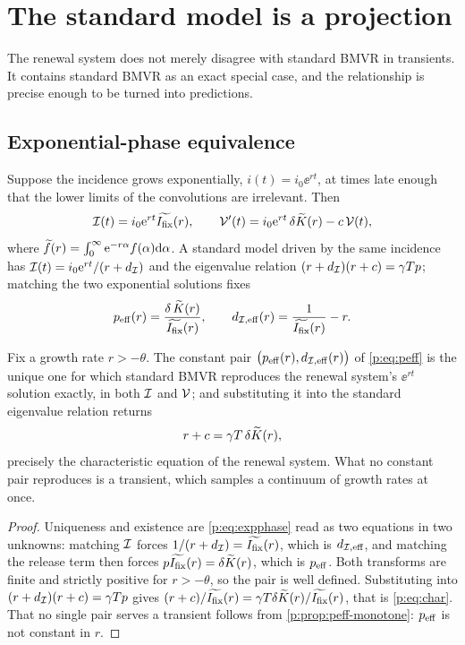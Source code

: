 \FloatBarrier

\section{The standard model is a projection}
\label{p:sec:projection}

The renewal system does not merely disagree with standard BMVR in
transients. It contains standard BMVR as an exact special case, and the
relationship is precise enough to be turned into predictions.

\subsection{Exponential-phase equivalence}

Suppose the incidence grows exponentially, $i(t)=i_0\ee^{rt}$, at times late
enough that the lower limits of the convolutions are irrelevant. Then
\begin{equation}
\mathcal{I}(t)=i_0\mathrm{e}^{rt}\widetilde{I_{\mathrm{fix}}}(r),
\qquad
\mathcal{V}'(t)=i_0\mathrm{e}^{rt}\,\delta\widetilde{K}(r)-c\,\mathcal{V}(t),
\label{p:eq:expphase}
\end{equation}
where $\widetilde{f}(r)=\int_0^\infty\mathrm{e}^{-r\alpha}f(\alpha)\mathrm{d}\alpha$. A standard
model driven by the same incidence has $\mathcal{I}(t)=i_0\mathrm{e}^{rt}/(r+d_{\mathcal{I}})$
and the eigenvalue relation $(r+d_{\mathcal{I}})(r+c)=\gamma Tp$; matching the two
exponential solutions fixes
\begin{equation}
p_{\rm eff}(r)=\frac{\delta\,\widetilde{K}(r)}{\widetilde{I_{\mathrm{fix}}}(r)},
\qquad
d_{\mathcal{I},{\rm eff}}(r)=\frac{1}{\widetilde{I_{\mathrm{fix}}}(r)}-r.
\label{p:eq:peff}
\end{equation}

\begin{theorem}
\label{p:thm:projection}
Fix a growth rate $r>-\theta$. The constant pair
$\bigl(p_{\rm eff}(r),d_{\mathcal{I},{\rm eff}}(r)\bigr)$ of \cref{p:eq:peff} is
the unique one for which standard BMVR reproduces the renewal system's
$\ee^{rt}$ solution exactly, in both $\mathcal{I}$ and $\mathcal{V}$; and substituting
it into the standard eigenvalue relation returns
\begin{equation}
r+c=\gamma T\,\delta\widetilde{K}(r),
\label{p:eq:char}
\end{equation}
precisely the characteristic equation of the renewal system. What no
constant pair reproduces is a transient, which samples a continuum of growth
rates at once.
\end{theorem}

\begin{proof}
Uniqueness and existence are \cref{p:eq:expphase} read as two equations in
two unknowns: matching $\mathcal{I}$ forces $1/(r+d_{\mathcal{I}})=\widetilde{I_{\mathrm{fix}}}(r)$,
which is $d_{\mathcal{I},{\rm eff}}$, and matching the release term then forces
$p\widetilde{I_{\mathrm{fix}}}(r)=\delta\widetilde{K}(r)$, which is $p_{\rm eff}$. Both transforms
are finite and strictly positive for $r>-\theta$, so the pair is well
defined. Substituting into $(r+d_{\mathcal{I}})(r+c)=\gamma Tp$ gives
$(r+c)/\widetilde{I_{\mathrm{fix}}}(r)=\gamma T\delta\widetilde{K}(r)/\widetilde{I_{\mathrm{fix}}}(r)$, that is
\cref{p:eq:char}. That no single pair serves a transient follows from
\cref{p:prop:peff-monotone}: $p_{\rm eff}$ is not constant in $r$.
\end{proof}

